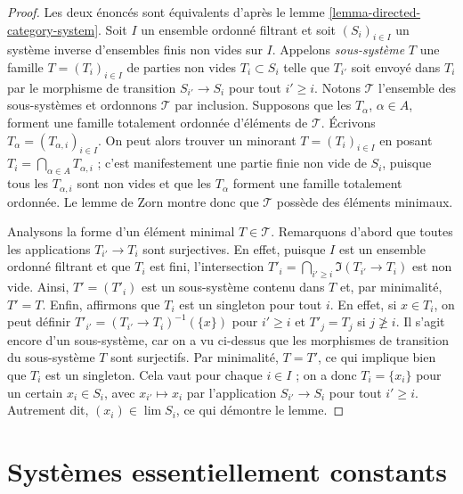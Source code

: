\begin{proof}
Les deux énoncés sont équivalents d'après le
lemme \ref{lemma-directed-category-system}. Soit $I$ un ensemble ordonné
filtrant et soit $(S_i)_{i \in I}$ un système inverse d'ensembles finis non
vides sur $I$. Appelons {\it sous-système} $T$ une famille
$T = (T_i)_{i \in I}$ de parties non vides $T_i \subset S_i$ telle que
$T_{i'}$ soit envoyé dans $T_i$ par le morphisme de transition
$S_{i'} \to S_i$ pour tout $i' \geq i$. Notons $\mathcal{T}$ l'ensemble des
sous-systèmes et ordonnons $\mathcal{T}$ par inclusion. Supposons que les
$T_\alpha$, $\alpha \in A$, forment une famille totalement ordonnée d'éléments
de $\mathcal{T}$. Écrivons
$T_\alpha = (T_{\alpha, i})_{i \in I}$. On peut alors trouver un minorant
$T = (T_i)_{i \in I}$ en posant
$T_i = \bigcap_{\alpha \in A} T_{\alpha, i}$ ; c'est manifestement une partie
finie non vide de $S_i$, puisque tous les $T_{\alpha, i}$ sont non vides et
que les $T_\alpha$ forment une famille totalement ordonnée. Le lemme de Zorn
montre donc que $\mathcal{T}$ possède des éléments minimaux.

\medskip\noindent
Analysons la forme d'un élément minimal $T \in \mathcal{T}$. Remarquons
d'abord que toutes les applications $T_{i'} \to T_i$ sont surjectives.
En effet, puisque $I$ est un ensemble ordonné filtrant et que $T_i$ est fini,
l'intersection $T'_i = \bigcap_{i' \geq i} \Im(T_{i'} \to T_i)$ est non vide.
Ainsi, $T' = (T'_i)$ est un sous-système contenu dans $T$ et, par minimalité,
$T' = T$. Enfin, affirmons que $T_i$ est un singleton pour tout $i$. En effet,
si $x \in T_i$, on peut définir
$T'_{i'} = (T_{i'} \to T_i)^{-1}(\{x\})$ pour $i' \geq i$ et
$T'_j = T_j$ si $j \not \geq i$. Il s'agit encore d'un sous-système, car on
a vu ci-dessus que les morphismes de transition du sous-système $T$ sont
surjectifs. Par minimalité, $T = T'$, ce qui implique bien que $T_i$ est un
singleton. Cela vaut pour chaque $i \in I$ ; on a donc
$T_i = \{x_i\}$ pour un certain $x_i \in S_i$, avec $x_{i'} \mapsto x_i$
par l'application $S_{i'} \to S_i$ pour tout $i' \geq i$. Autrement dit,
$(x_i) \in \lim S_i$, ce qui démontre le lemme.
\end{proof}






\section{Systèmes essentiellement constants}
\label{section-essentially-constant}

